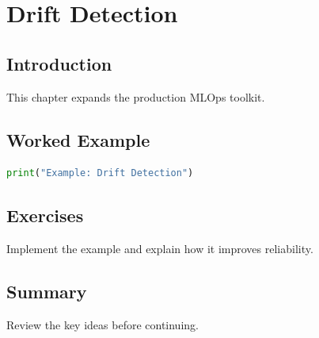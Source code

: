 \chapter{Drift Detection}
\label{chap:vol10-9}



\section{Introduction}
This chapter expands the production MLOps toolkit.

\section{Worked Example}
\begin{lstlisting}[language=Python]
print("Example: Drift Detection")
\end{lstlisting}

\section{Exercises}
\begin{exercise}
Implement the example and explain how it improves reliability.
\end{exercise}

\section{Summary}
Review the key ideas before continuing.

